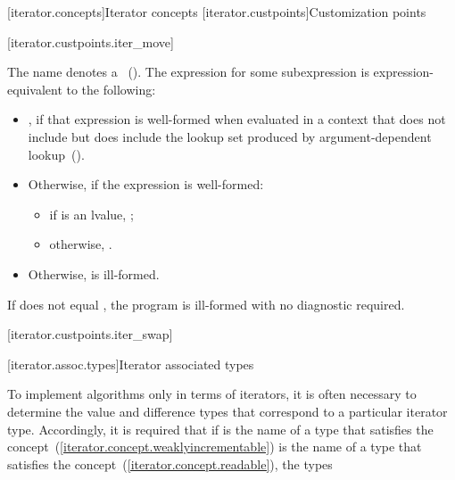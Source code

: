 [iterator.concepts]{Iterator concepts}
[iterator.custpoints]{Customization points}

[iterator.custpoints.iter_move]{}

\pnum
The name  denotes a ~(). The expression
 for some subexpression  is expression-equivalent to the
following:

\begin{itemize}
\item {}, if that expression
is well-formed when evaluated in a context that does not include
 but does include the
lookup set produced by argument-dependent lookup~().

\item Otherwise, if the expression  is well-formed:
\begin{itemize}
\item if  is an lvalue, ;

\item otherwise, .
\end{itemize}

\item Otherwise,  is ill-formed.
\end{itemize}

\pnum
If  does not equal , the program is
ill-formed with no diagnostic required.

[iterator.custpoints.iter_swap]{}


[iterator.assoc.types]{Iterator associated types}

\pnum
To implement algorithms only in terms of iterators, it is often necessary to
determine the value and
difference types that correspond to a particular iterator type.
Accordingly, it is required that if
 is the name of a type that
satisfies the  concept~(\ref{iterator.concept.weaklyincrementable})
 is the name of a type that
satisfies the  concept~(\ref{iterator.concept.readable}), the types

